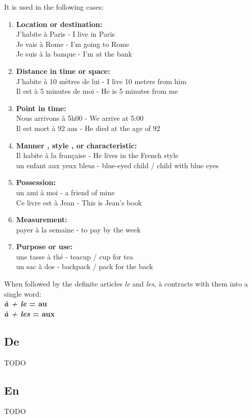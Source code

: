 It is used in the following cases:

\begin{enumerate}
\item{\textbf{Location or destination:}\\
J'habite \`{a} Paris - I live in Paris\\
Je vais \`{a} Rome - I'm going to Rome\\
Je suis \`{a} la banque - I'm at the bank}

\item{\textbf{Distance in time or space:}\\
J'habite \`{a} 10 m\`{e}tres de lui - I live 10 meters from him\\
Il est \`{a} 5 minutes de moi - He is 5 minutes from me}

\item{\textbf{Point in time:}\\
Nous arrivons \`{a} 5h00 - We arrive at 5:00\\
Il est mort \`{a} 92 ans - He died at the age of 92}

\item{\textbf{Manner , style , or characteristic:}\\
Il habite \`{a} la fran\c{c}aise - He lives in the French style\\
un enfant aux yeux bleus - blue-eyed child / child with blue eyes}

\item{\textbf{Possession:}\\
un ami \`{a} moi - a friend of mine\\
Ce livre est \`{a} Jean - This is Jean's book}

\item{\textbf{Measurement:}\\
payer \`{a} la semaine - to pay by the week}

\item{\textbf{Purpose or use:}\\
une tasse \`{a} th\'{e} - teacup / cup for tea\\
un sac \`{a} dos - backpack / pack for the back}
\end{enumerate}

\noindent When followed by the definite articles \emph{le}
and \emph{les}, \`a contracts with them into a single word:\\
\textbf{\emph{\`a + le} = au}   \\
\textbf{\emph{\`a + les} = aux} \\

\subsection{De}
TODO

\subsection{En}
TODO
